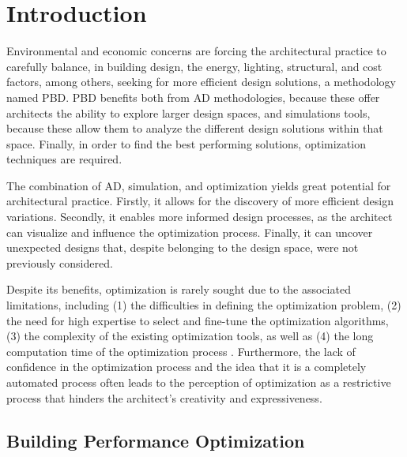 \section{Introduction}
\label{sec:intro}


	Environmental and economic concerns are forcing the architectural practice to carefully balance, in building design, the energy, lighting, structural, and cost factors, among others, seeking for more efficient design solutions, a methodology named \ac{PBD}. \ac{PBD} benefits both from \ac{AD} methodologies, because these offer architects the ability to explore larger design spaces, and simulations tools, because these allow them to analyze the different design solutions within that space. Finally, in order to find the best performing solutions, optimization techniques are required. 

	The combination of \ac{AD}, simulation, and optimization yields great potential for architectural practice. Firstly, it allows for the discovery of more efficient design variations. Secondly, it enables more informed design processes, as the architect can visualize and influence the optimization process. Finally, it can uncover unexpected designs that, despite belonging to the design space, were not previously considered.

	Despite its benefits, optimization is rarely sought due to the associated limitations, including (1) the difficulties in defining the optimization problem, (2) the need for high expertise to select and fine-tune the optimization algorithms, (3) the complexity of the existing optimization tools, as well as (4) the long computation time of the optimization process \cite{Attia2013,Nguyen2014}. Furthermore, the lack of confidence in the optimization process and the idea that it is a completely automated process often leads to the perception of optimization as a restrictive process that hinders the architect’s creativity and expressiveness.

	
\subsection{Building Performance Optimization}
	
	
	
